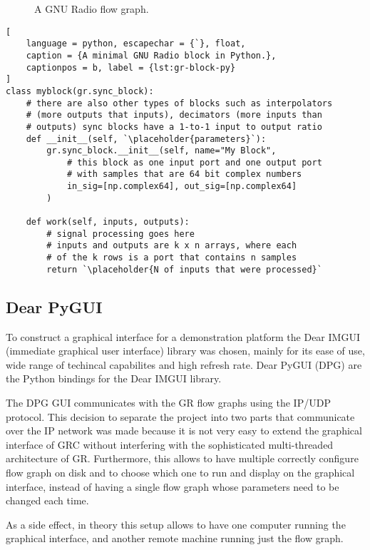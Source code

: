 \begin{figure}
	\caption{
		A GNU Radio flow graph.
		\label{fig:flowgraph}
	}
\end{figure}

{\newcommand{\placeholder}[1]{\textit{\(\langle\)\,\textrm{#1}\,\(\rangle\)}}
\begin{lstlisting}[
	language = python, escapechar = {`}, float,
	caption = {A minimal GNU Radio block in Python.},
	captionpos = b, label = {lst:gr-block-py}
]
class myblock(gr.sync_block):
	# there are also other types of blocks such as interpolators 
	# (more outputs that inputs), decimators (more inputs than 
	# outputs) sync blocks have a 1-to-1 input to output ratio
	def __init__(self, `\placeholder{parameters}`):
		gr.sync_block.__init__(self, name="My Block",
			# this block as one input port and one output port
			# with samples that are 64 bit complex numbers
			in_sig=[np.complex64], out_sig=[np.complex64]
		)

	def work(self, inputs, outputs):
		# signal processing goes here
		# inputs and outputs are k x n arrays, where each
		# of the k rows is a port that contains n samples
		return `\placeholder{N of inputs that were processed}`
\end{lstlisting}}

\subsection{Dear PyGUI}\label{sec:GUI}

To construct a graphical interface for a demonstration platform the Dear IMGUI (immediate graphical user interface) library was chosen, mainly for its ease of use, wide range of techincal capabilites and high refresh rate. Dear PyGUI (DPG) are the Python bindings for the Dear IMGUI library.

The DPG GUI communicates with the GR flow graphs using the IP/UDP protocol. This decision to separate the project into two parts that communicate over the IP network was made because it is not very easy to extend the graphical interface of GRC without interfering with the sophisticated multi-threaded architecture of GR. Furthermore, this allows to have multiple correctly configure flow graph on disk and to choose which one to run and display on the graphical interface, instead of having a single flow graph whose parameters need to be changed each time.

As a side effect, in theory this setup allows to have one computer running the graphical interface, and another remote machine running just the flow graph.

